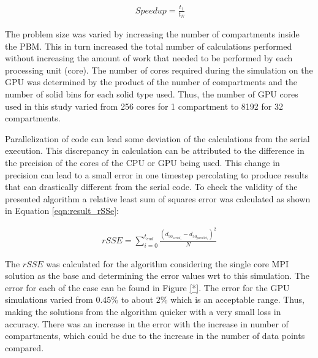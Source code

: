 \documentclass[preprint,10pt,authoryear,review]{elsarticle}
\begin{document}
\begin{align}
\ Speedup = \frac{t_1}{t_N}
\label{eqn:result_parallelefficiencyWeak}
\end{align}

The problem size was varied by increasing the number of compartments inside 
the PBM. This in turn increased the total number of calculations performed 
without increasing the amount of work that needed to be performed by each 
processing unit (core). The number of cores required during the simulation 
on the GPU was determined by the product of the number of compartments and 
the number of solid bins for each solid type used. Thus, the number of GPU 
cores used in this study varied from 256 cores for 1 compartment to 8192 
for 32 compartments.

Parallelization of code can lead some deviation of the calculations from 
the serial execution. This discrepancy in calculation can be attributed to 
the difference in the precision of the cores of the CPU or GPU being used. 
This change in precision can lead to a small error in one timestep 
percolating to produce results that can drastically different from the serial 
code. To check the validity of the presented algorithm a relative least sum 
of squares error was calculated as shown in Equation \ref{eqn:result_rSSe}:

\begin{align}
rSSE =  \sum_{i=0}^{t_{end}} \frac{(d_{50_{serial_i}}-d_{50_{parallel_i}})^2}{N}
\label{eqn:result_rSSe}
\end{align}

The $rSSE$ was calculated for the algorithm considering the single core MPI 
solution as the base and determining the error values wrt to this simulation.
The error for each of the case can be found in Figure \ref{*}. The error 
for the GPU simulations varied from $0.45\%$ to about $2\%$ which is an acceptable 
range. Thus, making the solutions from the algorithm quicker with a very small 
loss in accuracy. There was an increase in the error with the increase in number 
of compartments, which could be due to the increase in the number of data points compared. 
\end{document}

